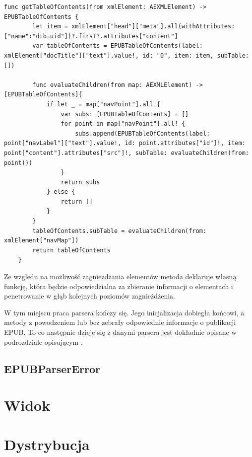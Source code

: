 \begin{lstlisting}[caption={Implementacja metody getTableOfContents(from xmlElement:).},language=swift-reference]
    func getTableOfContents(from xmlElement: AEXMLElement) -> EPUBTableOfContents {
        let item = xmlElement["head"]["meta"].all(withAttributes: ["name":"dtb=uid"])?.first?.attributes["content"]
        var tableOfContents = EPUBTableOfContents(label: xmlElement["docTitle"]["text"].value!, id: "0", item: item, subTable: [])

        func evaluateChildren(from map: AEXMLElement) -> [EPUBTableOfContents]{
            if let _ = map["navPoint"].all {
                var subs: [EPUBTableOfContents] = []
                for point in map["navPoint"].all! {
                    subs.append(EPUBTableOfContents(label: point["navLabel"]["text"].value!, id: point.attributes["id"]!, item: point["content"].attributes["src"]!, subTable: evaluateChildren(from: point)))
                }
                return subs
            } else {
                return []
            }
        }
        tableOfContents.subTable = evaluateChildren(from: xmlElement["navMap"])
        return tableOfContents
    }
\end{lstlisting}

Ze wzgledu na możliwość zagnieżdżania elementów metoda deklaruje własną funkcję, która będzie odpowiedzialna za zbieranie informacji o elementach i penetrowanie w głąb kolejnych poziomów zagnieżdżenia.

W tym miejscu praca parsera kończy się. Jego inicjalizacja dobiegła końcowi, a metody z powodzeniem lub bez zebrały odpowiednie informacje o publikacji EPUB. To co następnie dzieje się z danymi parsera jest dokładnie opisane w podrozdziale opisującym .

\subsection{EPUBParserError}


\section{Widok}
\section{Dystrybucja}
